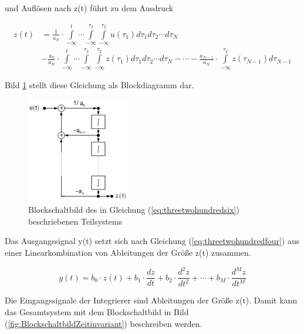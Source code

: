 \noindent und Auflösen nach z(t) führt zu dem Ausdruck

\begin{equation}\label{eq:threetwohundredsix}
\begin{split}
z(t) & = \frac{1}{a_{N}}\cdot  \int\limits _{-\infty }^{t} \cdots  \int\limits _{-\infty }^{\tau_{3}}  \int\limits _{-\infty }^{\tau_{2}} u(\tau _{1}) d\tau _{1} d\tau _{2} \cdots d\tau _{N} \\
 & - \frac{a_{0}}{a_{N}}\cdot\int\limits _{-\infty }^{t} \cdots  \int\limits _{-\infty }^{\tau_{3}}  \int\limits _{-\infty }^{\tau_{2}} z(\tau _{1}) d\tau _{1} d\tau _{2} \cdots d\tau _{N} - \cdots - \frac{a_{N-1}}{a_{N}}\cdot \int\limits _{-\infty }^{\tau_{2}} z(\tau _{N-1}) d\tau _{N-1}
\end{split}
\end{equation}	

\noindent Bild \ref{fig:BlockschaltbildTeilsystem} stellt diese Gleichung als Blockdiagramm dar.

\begin{figure}[H]
  \centerline{\includegraphics[width=0.4\textwidth]{Kapitel2/Bilder/image30}}
  \caption{Blockschaltbild des in Gleichung (\ref{eq:threetwohundredsix}) beschriebenen Teilsystems}
  \label{fig:BlockschaltbildTeilsystem}
\end{figure}

\noindent Das Ausgangssignal y(t) setzt sich nach Gleichung (\ref{eq:threetwohundredfour}) aus einer Linearkombination von Ableitungen der Größe z(t) zusammen.

\begin{equation}\label{eq:threetwohundredseven}
y(t) = b_{0}\cdot z(t) + b_{1}\cdot \frac{dz}{dt} + b_{2}\cdot \frac{d^2z}{dt^2} + \cdots + b_{M}\cdot \frac{d^Mz}{dt^M} 
\end{equation}

\noindent Die Eingangssignale der Integrierer sind Ableitungen der Größe z(t). Damit kann das Gesamtsystem mit dem Blockschaltbild in Bild (\ref{fig:BlockschaltbildZeitinvariant}) beschreiben werden.

